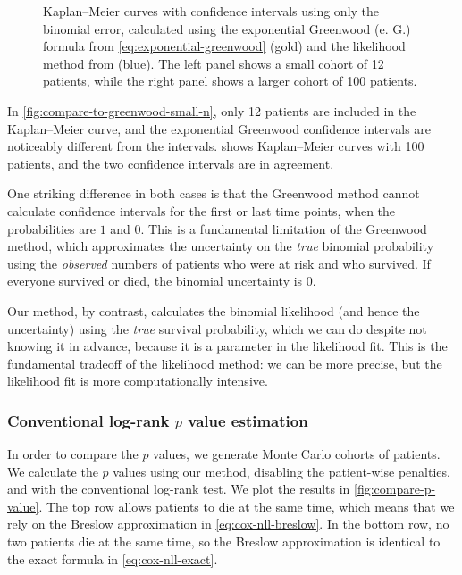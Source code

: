 \documentclass[article]{jss}
\newcommand{\KM}{Kaplan--Meier} %
\begin{document}
\begin{figure}
\begin{subfigure}[t]{0.49\textwidth}
  \caption{\label{fig:compare-to-greenwood-large-n}}
\end{subfigure}
\caption{\label{fig:compare-to-greenwood} \KM{} curves with confidence intervals using only the binomial error, calculated using the exponential Greenwood (e. G.) formula from \cref{eq:exponential-greenwood} (gold) and the likelihood method from  (blue). The left panel shows a small cohort of 12 patients, while the right panel shows a larger cohort of 100 patients.}
\end{figure}

In \cref{fig:compare-to-greenwood-small-n}, only 12 patients are included in the \KM{} curve, and the exponential Greenwood confidence intervals are noticeably different from the  intervals.  shows \KM{} curves with 100 patients, and the two confidence intervals are in agreement.

One striking difference in both cases is that the Greenwood method cannot calculate confidence intervals for the first or last time points, when the probabilities are \(1\) and \(0\). This is a fundamental limitation of the Greenwood method, which approximates the uncertainty on the \emph{true} binomial probability using the \emph{observed} numbers of patients who were at risk and who survived. If everyone survived or died, the binomial uncertainty is \(0\).

Our method, by contrast, calculates the binomial likelihood (and hence the uncertainty) using the \emph{true} survival probability, which we can do despite not knowing it in advance, because it is a parameter in the likelihood fit. This is the fundamental tradeoff of the likelihood method: we can be more precise, but the likelihood fit is more computationally intensive.

\subsubsection[Conventional log-rank p value estimation]{Conventional log-rank \(p\) value estimation}\label{sec:compare-to-conventional-p-value}

In order to compare the \(p\) values, we generate Monte Carlo cohorts of patients.  We calculate the \(p\) values using our method, disabling the patient-wise penalties, and with the conventional log-rank test.  We plot the results in \cref{fig:compare-p-value}.  The top row allows patients to die at the same time, which means that we rely on the Breslow approximation in \cref{eq:cox-nll-breslow}.  In the bottom row, no two patients die at the same time, so the Breslow approximation is identical to the exact formula in \cref{eq:cox-nll-exact}.
\end{document}
